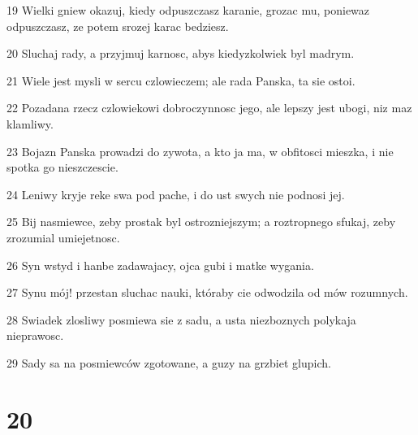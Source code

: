 \par 19 Wielki gniew okazuj, kiedy odpuszczasz karanie, grozac mu, poniewaz odpuszczasz, ze potem srozej karac bedziesz.
\par 20 Sluchaj rady, a przyjmuj karnosc, abys kiedyzkolwiek byl madrym.
\par 21 Wiele jest mysli w sercu czlowieczem; ale rada Panska, ta sie ostoi.
\par 22 Pozadana rzecz czlowiekowi dobroczynnosc jego, ale lepszy jest ubogi, niz maz klamliwy.
\par 23 Bojazn Panska prowadzi do zywota, a kto ja ma, w obfitosci mieszka, i nie spotka go nieszczescie.
\par 24 Leniwy kryje reke swa pod pache, i do ust swych nie podnosi jej.
\par 25 Bij nasmiewce, zeby prostak byl ostrozniejszym; a roztropnego sfukaj, zeby zrozumial umiejetnosc.
\par 26 Syn wstyd i hanbe zadawajacy, ojca gubi i matke wygania.
\par 27 Synu mój! przestan sluchac nauki, któraby cie odwodzila od mów rozumnych.
\par 28 Swiadek zlosliwy posmiewa sie z sadu, a usta niezboznych polykaja nieprawosc.
\par 29 Sady sa na posmiewców zgotowane, a guzy na grzbiet glupich.

\chapter{20}

